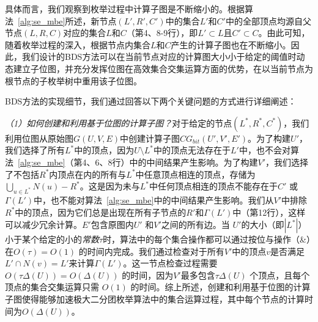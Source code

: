 具体而言，我们观察到枚举过程中计算子图是不断缩小的。根据算法~\ref{alg:se_mbe}所述，新节点$(L',R',C')$中的集合$L'$和$C'$中的全部顶点均源自父节点$(L, R, C)$对应的集合$L$和$C$（第4、8-9行），即$L'\subset L$且$C'\subset C$。由此可知，随着枚举过程的深入，根据节点内集合$L$和$C$产生的计算子图也在不断缩小。因此，我们设计的BDS方法可以在当前节点对应的计算图大小小于给定的阈值时动态建立子位图，并充分发挥位图在高效集合交集运算方面的优势，在以当前节点为根节点的子枚举树中重用该子位图。





BDS方法的实现细节，我们通过回答以下两个关键问题的方式进行详细阐述：

\textit{（1）如何创建和利用基于位图的计算子图？}对于给定的节点$(L^*, R^*, C^*)$，我们利用位图从原始图$G(U, V, E)$中创建计算子图$CG_{bit}(U',V',E')$。为了构建$U'$，我们选择了所有$L^*$中的顶点，因为$U \setminus L^*$中的顶点无法存在于$L'$中，也不会对算法~\ref{alg:se_mbe}（第4、6、8行）中的中间结果产生影响。为了构建$V'$，我们选择了不包括$R^*$内顶点在内的所有与$L^*$中任意顶点相连的顶点，存储为$\bigcup_{u \in L^*}N(u) - R^*$。这是因为未与$L^*$中任何顶点相连的顶点不能存在于$C'$ 或 $\Gamma(L')$中，也不能对算法~\ref{alg:se_mbe}中的中间结果产生影响。我们从$V'$中排除$R^*$中的顶点，因为它们总是出现在所有子节点的$R'$和$\Gamma(L')$中（第12行），这样可以减少冗余计算。$E'$包含原图内$U'$ 和$V'$之间的所有边。当 $U'$的大小（即$|L^*|$）小于某个给定的小的\emph{常数$\tau$}时，算法中的每个集合操作都可以通过按位与操作（\&）在$O(\tau) = O(1)$ 的时间内完成。我们通过检查对于所有$V'$中的顶点$v$是否满足$L' \cap N(v) = L'$来计算$\Gamma(L')$。这一节点检查过程需要$O(\tau \Delta(U))=O(\Delta(U))$ 的时间，因为$V'$最多包含$\tau \Delta(U)$ 个顶点，且每个顶点的集合交集运算只需 $O(1)$ 的时间。综上所述，创建和利用基于位图的计算子图使得能够加速极大二分团枚举算法中的集合运算过程，其中每个节点的计算时间为$O(\Delta(U))$。


